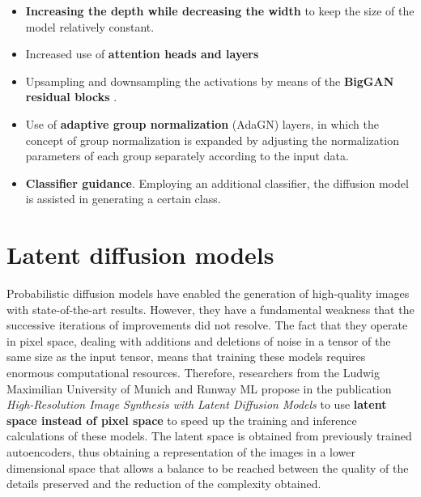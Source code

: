\begin{itemize}
    \item \textbf{Increasing the depth while decreasing the width} to keep the size of the model relatively constant.
    \item Increased use of \textbf{attention heads and layers}
    \item Upsampling and downsampling the activations by means of the \textbf{BigGAN residual blocks} \cite{brock2018large}.
    \item Use of \textbf{adaptive group normalization} (AdaGN) layers, in which the concept of group normalization is expanded by adjusting the normalization parameters of each group separately according to the input data.
    \item \textbf{Classifier guidance}. Employing an additional classifier, the diffusion model is assisted in generating a certain class.
\end{itemize}

\section{Latent diffusion models} \label{Ldiffusion}

Probabilistic diffusion models have enabled the generation of high-quality images with state-of-the-art results. However, they have a fundamental weakness that the successive iterations of improvements did not resolve. The fact that they operate in pixel space, dealing with additions and deletions of noise in a tensor of the same size as the input tensor, means that training these models requires enormous computational resources. Therefore, researchers from the Ludwig Maximilian University of Munich and Runway ML propose in the publication \textit{High-Resolution Image Synthesis with Latent Diffusion Models} \cite{rombach2022high} to use \textbf{latent space instead of pixel space} to speed up the training and inference calculations of these models. The latent space is obtained from previously trained autoencoders, thus obtaining a representation of the images in a lower dimensional space that allows a balance to be reached between the quality of the details preserved and the reduction of the complexity obtained.

